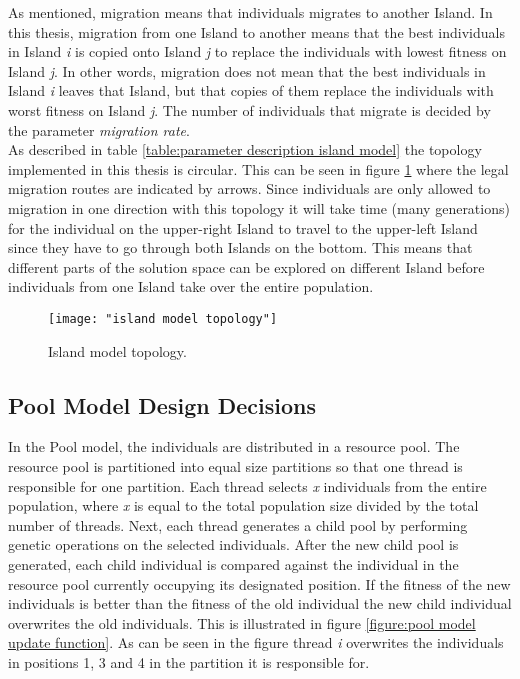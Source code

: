 \noindent As mentioned, migration means that individuals migrates to another Island. In this thesis, migration from one Island to another means that the best individuals in Island \textit{i} is copied onto Island \textit{j} to replace the individuals with lowest fitness on Island \textit{j}. In other words, migration does not mean that the best individuals in Island \textit{i} leaves that Island, but that copies of them replace the individuals with worst fitness on Island \textit{j}. The number of individuals that migrate is decided by the parameter \textit{migration rate}.\\


\noindent As described in table \ref{table:parameter description island model} the topology implemented in this thesis is circular. This can be seen in figure \ref{figure:topology island model} where the legal migration routes are indicated by arrows. Since individuals are only allowed to migration in one direction with this topology it will take time (many generations) for the individual on the upper-right Island to travel to the upper-left Island since they have to go through both Islands on the bottom. This means that different parts of the solution space can be explored on different Island before individuals from one Island take over the entire population.


\begin{figure}
    \begin{center}
        \texttt{[image: "island model topology"]}
        \caption{Island model topology.}
        \label{figure:topology island model}
    \end{center}
\end{figure}


\subsection{Pool Model Design Decisions}


\noindent In the Pool model, the individuals are distributed in a resource pool. The resource pool is partitioned into equal size partitions so that one thread is responsible for one partition. Each thread selects \textit{x} individuals from the entire population, where \textit{x} is equal to the total population size divided by the total number of threads. Next, each thread generates a child pool by performing genetic operations on the selected individuals. After the new child pool is generated, each child individual is compared against the individual in the resource pool currently occupying its designated position. If the fitness of the new individuals is better than the fitness of the old individual the new child individual overwrites the old individuals. This is illustrated in figure \ref{figure:pool model update function}. As can be seen in the figure thread \textit{i} overwrites the individuals in positions 1, 3 and 4 in the partition it is responsible for.\\


